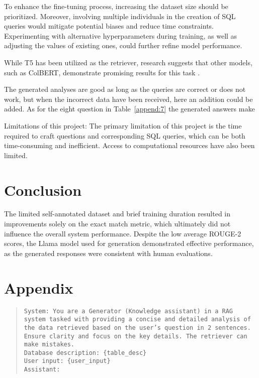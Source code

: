 \documentclass[11pt]{article}
\begin{document}
To enhance the fine-tuning process, increasing the dataset size should be prioritized. Moreover, involving multiple individuals in the creation of SQL queries would mitigate potential biases and reduce time constraints. Experimenting with alternative hyperparameters during training, as well as adjusting the values of existing ones, could further refine model performance.

While T5 has been utilized as the retriever, research suggests that other models, such as ColBERT, demonstrate promising results for this task \cite{Lin2023}.

The generated analyses are good as long as the queries are correct or does not work, but when the incorrect data have been received, here an addition could be added. As for the eight question in Table~\ref{append:7} the generated answers make 

Limitations of this project:
The primary limitation of this project is the time required to craft questions and corresponding SQL queries, which can be both time-consuming and inefficient. Access to computational resources have also been limited. 



\section{Conclusion}

The limited self-annotated dataset and brief training duration resulted in improvements solely on the exact match metric, which ultimately did not influence the overall system performance. 
Despite the low average ROUGE-2 scores, the Llama model used for generation demonstrated effective performance, as the generated responses were consistent with human evaluations.





\newpage
\appendix
\section{Appendix}

\label{sec:appendix}



\begin{quote}
\texttt{System: You are a Generator (Knowledge assistant) in a RAG system tasked with providing a concise and detailed analysis of the data retrieved based on the user's question in 2 sentences. Ensure clarity and focus on the key details. The retriever can make mistakes.}
\\
\texttt{Database description: \{table\_desc\}}
\\
\texttt{User input: \{user\_input\}}
\\
\texttt{Assistant:}
\label{append:8}
\end{quote}
\end{document}
